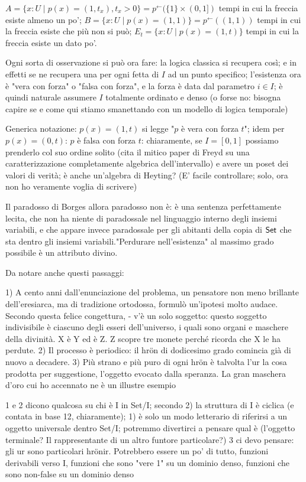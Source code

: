 \documentclass{amsart}
\begin{document}
$A = \{x : U \mid p(x) = (1,t_x), t_x > 0\} = p^\leftarrow(\{1\}\times (0,1])$ tempi in cui la freccia esiste almeno un po';
$B = \{x : U \mid p(x) = (1,1)\} = p^\leftarrow((1,1))$ tempi in cui la freccia esiste che più non si può;
$E_t = \{ x : U \mid p(x)=(1,t)\}$ tempi in cui la freccia esiste un dato po'.

Ogni sorta di osservazione si può ora fare: la logica classica si recupera così; e in effetti se ne recupera una per ogni fetta di $I$ ad un punto specifico; l'esistenza ora è "vera con forza" o "falsa con forza", e la forza è data dal parametro $i\in I$; è quindi naturale assumere $I$ totalmente ordinato e denso (o forse no: bisogna capire se e come qui stiamo smanettando con un modello di logica temporale)

Generica notazione: $p(x)=(1,t)$ si legge "$p$ è vera con forza $t$"; idem per $p(x)=(0,t)$: $p$ è falsa con forza $t$: chiaramente, se $I=[0,1]$ possiamo prenderlo col suo ordine solito (cita il mitico paper di Freyd su una caratterizzazione completamente algebrica dell'intervallo) e avere un poset dei valori di verità; è anche un'algebra di Heyting? (E' facile controllare; solo, ora non ho veramente voglia di scrivere)

Il paradosso di Borges allora paradosso non è: è una sentenza perfettamente lecita, che non ha niente di paradossale nel linguaggio interno degli insiemi variabili, e che appare invece paradossale per gli abitanti della copia di $\mathsf{Set}$ che sta dentro gli insiemi variabili."Perdurare nell'esistenza" al massimo grado possibile è un attributo divino.

Da notare anche questi passaggi:

1) A cento anni dall’enunciazione del problema, un pensatore non meno brillante dell'eresiarca, ma di tradizione ortodossa, formulò un'ipotesi molto audace.  Secondo  questa  felice  congettura,  -  v'è  un solo  soggetto:  questo soggetto indivisibile è ciascuno degli esseri dell'universo, i quali sono organi e maschere della divinità. X è Y ed è Z. Z scopre tre monete perché ricorda che X le ha perdute.
2) Il processo è periodico: il hrön di dodicesimo grado comincia già di nuovo a decadere.
3) Più strano e più  puro di ogni hrön è talvolta l'ur la cosa prodotta per suggestione, l’oggetto evocato dalla speranza. La gran maschera d’oro cui ho accennato ne è un illustre esempio

1 e 2 dicono qualcosa su chi è I in Set/I; secondo 2) la struttura di I è ciclica (e contata in base 12, chiaramente);  1) è solo un modo letterario di riferirsi a un oggetto universale dentro Set/I; potremmo divertirci a pensare qual è (l'oggetto terminale? Il rappresentante di un altro funtore particolare?)
3 ci devo pensare: gli ur sono particolari hrönir. Potrebbero essere un po' di tutto, funzioni derivabili verso I, funzioni che sono "vere 1" su un dominio denso, funzioni che sono non-false su un dominio denso
\end{document}
